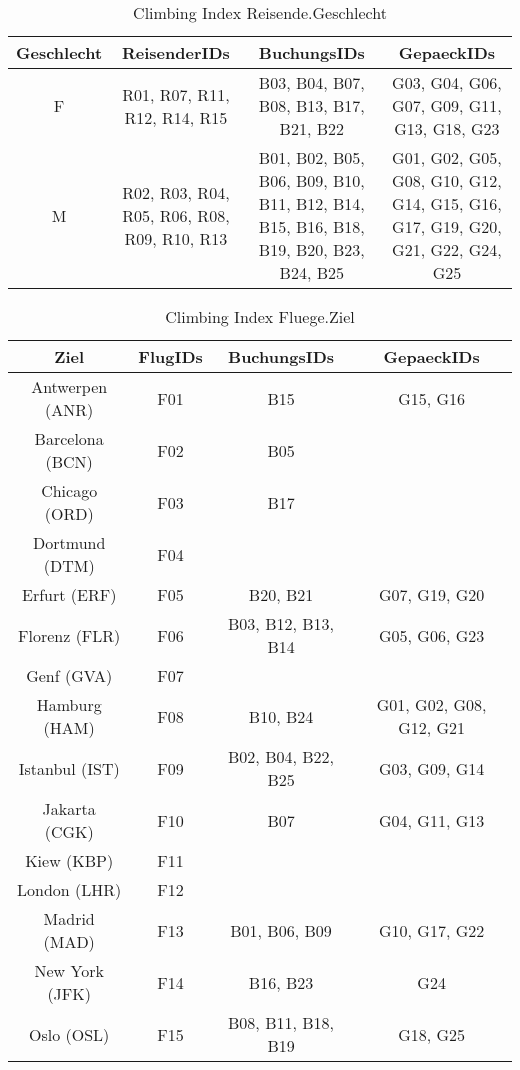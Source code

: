 %
\begin{sidewaystable}[htbp]
\centering
\begin{tabularx}{\textwidth}{|C|C|C|C|}
\hline
\bfseries Geschlecht&\bfseries ReisenderIDs&\bfseries BuchungsIDs&\bfseries GepaeckIDs\\
\hline
F&R01, R07, R11, R12, R14, R15&B03, B04, B07, B08, B13, B17, B21, B22&G03, G04, G06, G07, G09, G11, G13, G18, G23\\
\hline
M&R02, R03, R04, R05, R06, R08, R09, R10, R13&B01, B02, B05, B06, B09, B10, B11, B12, B14, B15, B16, B18, B19, B20, B23, B24, B25&G01, G02, G05, G08, G10, G12, G14, G15, G16, G17, G19, G20, G21, G22, G24, G25\\
\hline
\end{tabularx}
\caption{Climbing Index Reisende.Geschlecht}
\label{tab:ClimbingIndexReisendeGeschlecht}
\end{sidewaystable}
%
\begin{table}[htbp]
\centering
\begin{tabular}{|c|c|c|c|}
\hline
\bfseries Ziel&\bfseries FlugIDs&\bfseries BuchungsIDs&\bfseries GepaeckIDs\\
\hline
Antwerpen (ANR)&F01&B15&G15, G16\\
\hline
Barcelona (BCN)&F02&B05&\\
\hline
Chicago (ORD)&F03&B17&\\
\hline
Dortmund (DTM)&F04&&\\
\hline
Erfurt (ERF)&F05&B20, B21&G07, G19, G20\\
\hline
Florenz (FLR)&F06&B03, B12, B13, B14&G05, G06, G23\\
\hline
Genf (GVA)&F07&&\\
\hline
Hamburg (HAM)&F08&B10, B24&G01, G02, G08, G12, G21\\
\hline
Istanbul (IST)&F09&B02, B04, B22, B25&G03, G09, G14\\
\hline
Jakarta (CGK)&F10&B07&G04, G11, G13\\
\hline
Kiew (KBP)&F11&&\\
\hline
London (LHR)&F12&&\\
\hline
Madrid (MAD)&F13&B01, B06, B09&G10, G17, G22\\
\hline
New York (JFK)&F14&B16, B23&G24\\
\hline
Oslo (OSL)&F15&B08, B11, B18, B19&G18, G25\\
\hline
\end{tabular}
\caption{Climbing Index Fluege.Ziel}
\label{tab:ClimbingIndexFluegeZiel}
\end{table}
